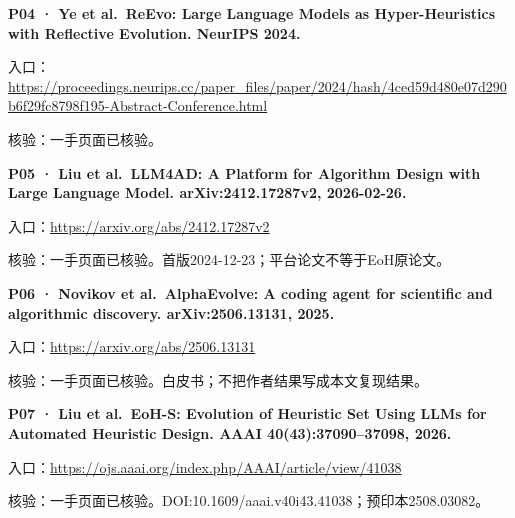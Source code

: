 \par\noindent\begin{minipage}{\linewidth}
\textbf{P04 · Ye et al.~ReEvo: Large Language Models as Hyper-Heuristics
with Reflective Evolution. NeurIPS 2024.}

入口：\url{https://proceedings.neurips.cc/paper_files/paper/2024/hash/4ced59d480e07d290b6f29fc8798f195-Abstract-Conference.html}

核验：一手页面已核验。
\end{minipage}\par\vspace{6pt}

\par\noindent\begin{minipage}{\linewidth}
\textbf{P05 · Liu et al.~LLM4AD: A Platform for Algorithm Design with
Large Language Model. arXiv:\allowbreak{}2412.17287v2, 2026-02-26.}

入口：\url{https://arxiv.org/abs/2412.17287v2}

核验：一手页面已核验。首版2024-12-23；平台论文不等于EoH原论文。
\end{minipage}\par\vspace{6pt}

\par\noindent\begin{minipage}{\linewidth}
\textbf{P06 · Novikov et al.~AlphaEvolve: A coding agent for scientific
and algorithmic discovery. arXiv:\allowbreak{}2506.13131, 2025.}

入口：\url{https://arxiv.org/abs/2506.13131}

核验：一手页面已核验。白皮书；不把作者结果写成本文复现结果。
\end{minipage}\par\vspace{6pt}

\par\noindent\begin{minipage}{\linewidth}
\textbf{P07 · Liu et al.~EoH-S: Evolution of Heuristic Set Using LLMs
for Automated Heuristic Design. AAAI 40(43):37090--37098, 2026.}

入口：\url{https://ojs.aaai.org/index.php/AAAI/article/view/41038}

核验：一手页面已核验。DOI:10.1609/aaai.v40i43.41038；预印本2508.03082。
\end{minipage}\par\vspace{6pt}

